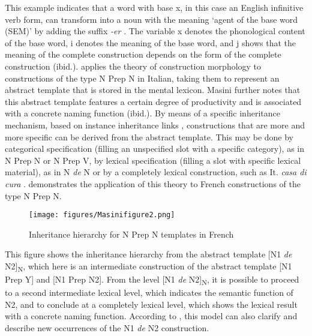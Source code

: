 \documentclass[output=paper]{langsci/langscibook}
\begin{document}
This example indicates that a word with base x, in this case an English infinitive verb form, can transform into a noun with the meaning `agent of the base word (SEM)' by adding the suffix \textit{-er} \citep[2]{Booij:2015}. The variable x denotes the phonological content of the base word, i denotes the meaning of the base word, and j shows that the meaning of the complete construction depends on the form of the complete construction (ibid.). \citet[261]{Masini:2009} applies the theory of construction morphology to constructions of the type N Prep N in Italian, taking them to represent an abstract template that is stored in the mental lexicon. Masini further notes that this abstract template features a certain degree of productivity and is associated with a concrete naming function (ibid.). By means of a specific inheritance mechanism, based on instance inheritance links \citep{Goldberg:1995}, constructions that are more and more specific can be derived from the abstract template. This may be done by categorical specification (filling an unspecified slot with a specific category), as in N Prep N or N Prep V, by lexical specification (filling a slot with specific lexical material), as in N \textit{de} N or by a completely lexical construction, such as It. \textit{casa di cura} \citep[261]{Masini:2009}.  demonstrates the application of this theory to French constructions of the type N Prep N.

\begin{figure}
\caption{Inheritance hierarchy for N Prep N templates in French \citep[263]{Masini:2009}\label{fig:hen:1}}
\texttt{[image: figures/Masinifigure2.png]} 
\end{figure}

This figure shows the inheritance hierarchy from the abstract template [N1 \textit{de} N2]\textsubscript{N}, which here is an intermediate construction of the abstract template [N1 Prep Y] and [N1 Prep N2]. From the level [N1 \textit{de} N2]\textsubscript{N}, it is possible to proceed to a second intermediate lexical level, which indicates the semantic function of N2, and to conclude at a completely lexical level, which shows the lexical result with a concrete naming function. According to \citet[263]{Masini:2009}, this model can also clarify and describe new occurrences of the N1 \textit{de} N2 construction. 
\end{document}
